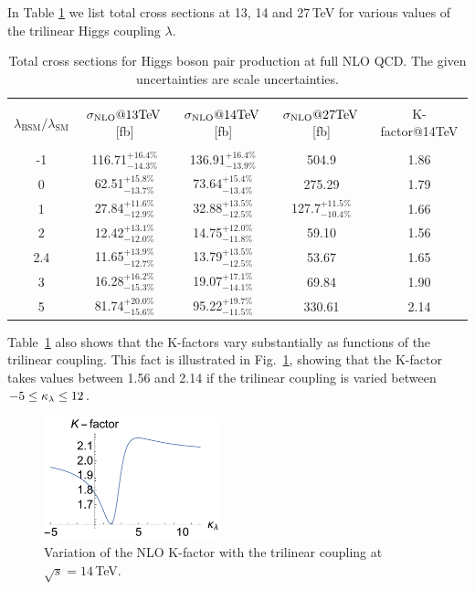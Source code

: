 In Table \ref{tab:sigmatot} we list total cross sections at 13, 14 and 27\,TeV for various values of the trilinear Higgs coupling $\lambda$. 
\begin{table}[htb]
\begin{center}
\begin{tabular}{| c | c | c |c|c|}
\hline
&&&&\\
$\lambda_{\mathrm{BSM}}/\lambda_{\mathrm{SM}}$ & $\sigma_{\rm{NLO}}@13 \mathrm{TeV}$\,[fb]& $\sigma_{\rm{NLO}}@14 \mathrm{TeV}$\,[fb] & $\sigma_{\rm{NLO}}@27 \mathrm{TeV}$\,[fb] &K-factor@14TeV\\
&&&&\\
\hline
-1& 116.71$^{+16.4\%}_{-14.3\%}$  & 136.91$^{+16.4\%}_{-13.9\%}$& 504.9 & 1.86 \\
\hline
0& 62.51$^{+15.8\%}_{-13.7\%}$ & 73.64$^{+15.4\%}_{-13.4\%}$& 275.29& 1.79  \\
\hline 
1& 27.84$^{+11.6\%}_{-12.9\%}$ & 32.88$^{+13.5\%}_{-12.5\%}$&127.7$^{+11.5\%}_{-10.4\%}$ &1.66\\
\hline
2 & 12.42$^{+13.1\%}_{-12.0\%}$ & 14.75$^{+12.0\%}_{-11.8\%}$ &  59.10 & 1.56 \\
\hline
2.4& 11.65$^{+13.9\%}_{-12.7\%}$ & 13.79$^{+13.5\%}_{-12.5\%}$& 53.67 & 1.65 \\
\hline
3& 16.28$^{+16.2\%}_{-15.3\%}$ & 19.07$^{+17.1\%}_{-14.1\%}$ & 69.84 & 1.90 \\
\hline 
5& 81.74$^{+20.0\%}_{-15.6\%}$  & 95.22$^{+19.7\%}_{-11.5\%}$& 330.61 & 2.14 \\
\hline 
\end{tabular}
\end{center}
\caption{Total cross sections for Higgs boson pair production at full NLO QCD. The given uncertainties are scale uncertainties. 
\label{tab:sigmatot}}
\end{table}
Table~\ref{tab:sigmatot} also shows that the K-factors vary substantially as functions of the trilinear coupling.
This fact is illustrated in Fig.~\ref{fig:Kfacvariation}, showing that the K-factor takes values between 1.56 and 2.14
if the trilinear coupling is varied between $-5\leq \kappa_{\lambda}\leq 12$.

\begin{figure}[htb]
  \centering
    \includegraphics[width=0.45\textwidth]{plots/Kfac_varlambda.pdf}
\caption{Variation of the NLO K-factor with the trilinear coupling at $\sqrt{s}=14$\,TeV.}
\label{fig:Kfacvariation}
\end{figure}


